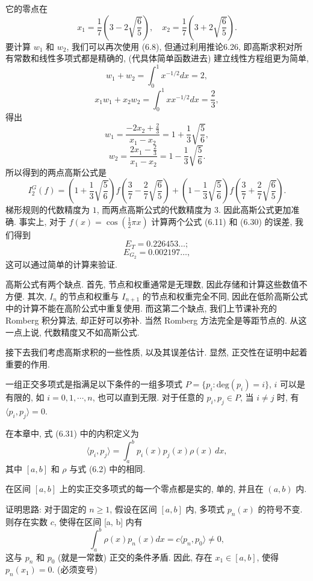 \documentclass[a4paper]{ctexart}
\newcommand{\hl}[1]
{\noindent {\bf {#1}}}
\begin{document}
{它的零点在
$$ 
x_1 = \frac{1}{7}\left(3 - 2\sqrt{\frac{6}{5}}\right), 
\quad x_2 = \frac{1}{7}\left(3 + 2\sqrt{\frac{6}{5}}\right). 
$$
要计算 $w_1$ 和 $w_2$, 我们可以再次使用 (6.8), 
但通过利用推论6.26, 即高斯求积对所有常数和线性多项式都是精确的, 
(代具体简单函数进去) 建立线性方程组更为简单, 
$$ 
w_1 + w_2 = \int_{0}^{1} x^{-1/2}dx = 2, 
$$
$$ 
x_1w_1 + x_2w_2 = \int_{0}^{1} xx^{-1/2}dx = \frac{2}{3}, 
$$
得出
$$ 
w_1 
= \frac{-2x_2 + \frac{2}{3}}{x_1 - x_2} 
= 1 + \frac{1}{3}\sqrt{\frac{5}{6}}, 
$$
$$ 
w_2 
= \frac{2x_1 - \frac{2}{3}}{x_1 - x_2} 
= 1 - \frac{1}{3}\sqrt{\frac{5}{6}}. 
$$
所以得到的两点高斯公式是
$$ 
I^G_2(f) 
= \left(1 + \frac{1}{3}\sqrt{\frac{5}{6}}\right)f\left(\frac{3}{7} 
- \frac{2}{7}\sqrt{\frac{6}{5}}\right) 
+ \left(1 - \frac{1}{3}\sqrt{\frac{5}{6}}\right)f\left(\frac{3}{7} 
+ \frac{2}{7}\sqrt{\frac{6}{5}}\right). 
$$ 
梯形规则的代数精度为 $1$, 而两点高斯公式的代数精度为 $3$. 
因此高斯公式更加准确. 
事实上, 对于 $f(x) = \cos\left(\frac{1}{2}\pi x\right)$ 计算两个公式 
(6.11) 和 (6.30) 的误差, 我们得到
$$ 
E_T = 0.226453\ldots; 
$$
$$ 
E_{G_2} = 0.002197\ldots, 
$$
这可以通过简单的计算来验证. 

高斯公式有两个缺点. 首先, 节点和权重通常是无理数, 因此存储和计算这些数值不方便. 其次, $I_n$ 
的节点和权重与 $I_{n+1}$ 的节点和权重完全不同, 因此在低阶高斯公式中的计算不能在高阶公式中重复使用.
而这第二个缺点, 我们上节课补充的 Romberg 积分算法, 却正好可以弥补. 当然 Romberg 方法完全是等距节点的. 
从这一点上说, 代数精度又不如高斯公式. 

接下去我们考虑高斯求积的一些性质, 以及其误差估计. 显然, 正交性在证明中起着重要的作用. 

\hl{定义 6.29} 一组正交多项式是指满足以下条件的一组多项式 
$P = \{p_i : \text{deg}(p_i) = i\}$, $i$ 可以是有限的, 如 $i = 0, 1, \cdots, n$, 也可以直到无限. 
对于任意的 $p_i, p_j \in P$, 当 $i \neq j$ 时, 有 $\langle p_i, p_j\rangle = 0$. 

\hl{例 6.30} 在本章中, 式 (6.31) 中的内积定义为
$$
\langle p_i, p_j\rangle = \int_{a}^{b} p_i(x) p_j(x) \rho(x) \, dx, 
$$
其中 $[a, b]$ 和 $\rho$ 与式 (6.2) 中的相同. 

\hl{定理 6.31} 在区间 $[a, b]$ 上的实正交多项式的每一个零点都是实的, 单的, 并且在 $(a, b)$ 内.

证明思路: 对于固定的 $n \geq 1$, 假设在区间 $[a, b]$ 内, 多项式 $p_n(x)$ 的符号不变. 
则存在实数 $c$, 使得在区间 [a, b] 内有
$$
\int_a^b \rho(x)p_n(x) dx = c \langle p_n, p_0 \rangle \neq 0,
$$
这与 $p_n$ 和 $p_0$ (就是一常数) 正交的条件矛盾. 因此, 存在 $x_1 \in [a, b]$, 使得 $p_n(x_1) = 0$.
(必须变号)

}
\end{document}
